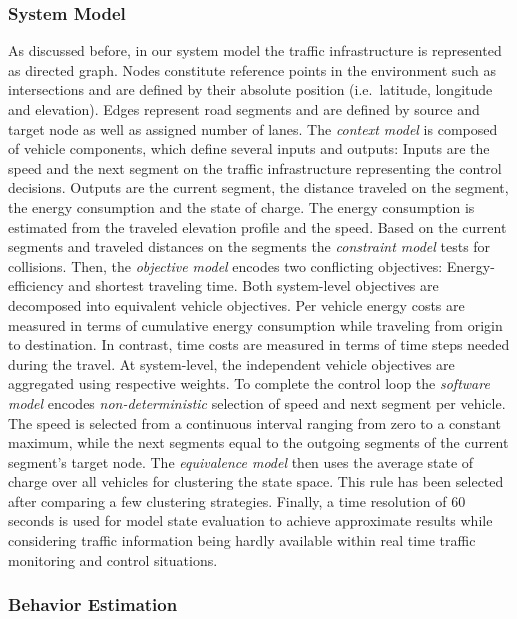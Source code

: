 \documentclass[conference]{../cls/IEEEtran}
\begin{document}
\subsubsection*{System Model}

As discussed before, in our system model the traffic infrastructure is
represented as directed graph. Nodes constitute reference points in the
environment such as intersections and are defined by their absolute position
(i.e.\ latitude, longitude and elevation). Edges represent road segments and are
defined by source and target node as well as assigned number of lanes. The
\textit{context model} is composed of vehicle components, which define several
inputs and outputs: Inputs are the speed and the next segment on the traffic
infrastructure representing the control decisions. Outputs are the current
segment, the distance traveled on the segment, the energy consumption and the
state of charge. The energy consumption is estimated from the traveled elevation
profile and the speed. Based on the current segments and traveled distances on
the segments the \textit{constraint model} tests for collisions. Then, the
\textit{objective model} encodes two conflicting objectives: Energy-efficiency
and shortest traveling time. Both system-level objectives are decomposed into
equivalent vehicle objectives. Per vehicle energy costs are measured in terms of
cumulative energy consumption while traveling from origin to destination. In
contrast, time costs are measured in terms of time steps needed during the
travel. At system-level, the independent vehicle objectives are aggregated using
respective weights. To complete the control loop the \textit{software model}
encodes \textit{non-deterministic} selection of speed and next segment per
vehicle. The speed is selected from a continuous interval ranging from zero to a
constant maximum, while the next segments equal to the outgoing segments of the
current segment's target node. The \textit{equivalence model} then uses the
average state of charge over all vehicles for clustering the state space. This
rule has been selected after comparing a few clustering strategies. Finally, a
time resolution of 60 seconds is used for model state evaluation to achieve
approximate results while considering traffic information being hardly
available within real time traffic monitoring and control situations.

\subsubsection*{Behavior Estimation}
\end{document}
